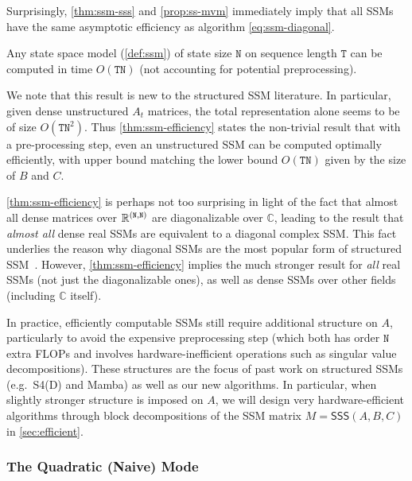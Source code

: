 Surprisingly, \cref{thm:ssm-sss} and \cref{prop:ss-mvm} immediately imply that all SSMs have the same asymptotic efficiency as algorithm \eqref{eq:ssm-diagonal}.
\begin{theorem}
  \label{thm:ssm-efficiency}
  Any state space model (\cref{def:ssm}) of state size $\mathtt{N}$ on sequence length $\mathtt{T}$ can be computed in time $O(\mathtt{TN})$ (not accounting for potential preprocessing).
\end{theorem}
We note that this result is new to the structured SSM literature.
In particular, given dense unstructured $A_t$ matrices, the total representation alone seems to be of size $O(\mathtt{TN}^2)$.
Thus \cref{thm:ssm-efficiency} states the non-trivial result that with a pre-processing step, even an unstructured SSM can be computed optimally efficiently,
with upper bound matching the lower bound $O(\mathtt{TN})$ given by the size of $B$ and $C$.

\begin{remark}
  \cref{thm:ssm-efficiency} is perhaps not too surprising in light of the fact that almost all dense matrices over $\mathbb{R}^{\mathtt{(N,N)}}$ are diagonalizable over $\mathbb{C}$,
  leading to the result that \emph{almost all} dense real SSMs are equivalent to a diagonal complex SSM.
  This fact underlies the reason why diagonal SSMs are the most popular form of structured SSM~\citep{gupta2022diagonal,gu2022parameterization,smith2023s5}.
  However, \cref{thm:ssm-efficiency} implies the much stronger result for \emph{all} real SSMs (not just the diagonalizable ones), as well as dense SSMs over other fields (including $\mathbb{C}$ itself).
\end{remark}

In practice, efficiently computable SSMs still require additional structure on $A$,
particularly to avoid the expensive preprocessing step (which both has order $\mathtt{N}$ extra FLOPs and involves hardware-inefficient operations such as singular value decompositions).
These structures are the focus of past work on structured SSMs (e.g.\ S4(D) and Mamba) as well as our new algorithms.
In particular, when slightly stronger structure is imposed on $A$, we will design very hardware-efficient algorithms through block decompositions of the SSM matrix $M = \mathsf{SSS}(A, B, C)$ in \cref{sec:efficient}.

\subsubsection{The Quadratic (Naive) Mode}


